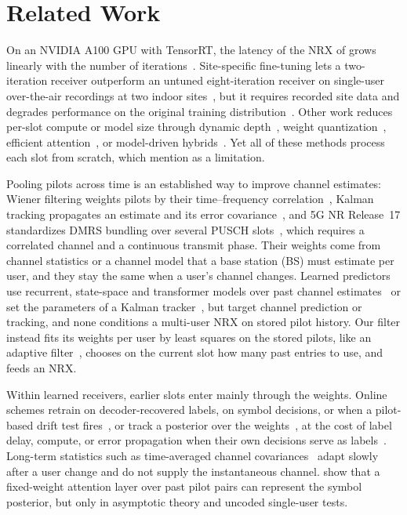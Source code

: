 \section{Related Work}
On an NVIDIA A100 GPU with TensorRT, the latency of the NRX of \citet{cammerer2023neural} grows linearly with the
number of iterations~\cite{wiesmayr2025realtime}. Site-specific fine-tuning lets a two-iteration receiver outperform an
untuned eight-iteration receiver on single-user over-the-air recordings at two indoor sites~\cite{baytekin2026site},
but it requires recorded site data and degrades performance on the original training
distribution~\cite{wiesmayr2025realtime}. Other work reduces per-slot compute or model size through dynamic
depth~\cite{vanbolderik2024layerskip}, weight quantization~\cite{yellapragada2026qat}, efficient
attention~\cite{yellapragada2026axial,kawai2025unified}, or model-driven hybrids~\cite{honkala2026eqdeeprx}. Yet all of these methods process each slot from scratch, which
\citet{kawai2025unified} mention as a limitation.

Pooling pilots across time is an established way to improve channel estimates: Wiener filtering weights pilots by
their time--frequency correlation~\cite{hoeher1997wiener}, Kalman tracking propagates an estimate and its error
covariance~\cite{komninakis2002kalman}, and 5G NR Release~17 standardizes DMRS bundling over several PUSCH
slots~\cite{3gpp38830,3gpp38214}, which requires a correlated channel and a continuous transmit phase. Their weights come
from channel statistics or a channel model that a base station (BS) must estimate per user, and they stay the same when
a user's channel changes. Learned predictors use recurrent, state-space and transformer models over past channel
estimates~\cite{mattu2022deep,luo2025cpmamba,lagona2026transformer} or set the
parameters of a Kalman tracker~\cite{pratik2021hkf}, but target channel prediction or tracking, and none conditions a
multi-user NRX on stored pilot history. Our filter instead fits its weights per user by least squares on the stored
pilots, like an adaptive filter~\cite{haykin2002adaptive}, chooses on the current slot how many past entries to use, and
feeds an NRX.

Within learned receivers, earlier slots enter mainly through the weights. Online schemes retrain on decoder-recovered
labels, on symbol decisions, or when a pilot-based drift test
fires~\cite{fischer2022adaptive,finish2022symbol,uzlaner2025asynchronous}, or track a posterior over the
weights~\cite{gusakov2026online}, at the cost of label delay, compute, or error propagation when their own decisions
serve as labels~\cite{fischer2022adaptive,gusakov2026online}. Long-term statistics such as time-averaged
channel covariances~\cite{wiesmayr2026impact} adapt slowly after a user change and do not supply the
instantaneous channel. \citet{kunde2025transformers} show that a fixed-weight attention layer over past pilot pairs can
represent the symbol posterior, but only in asymptotic theory and uncoded single-user tests.

